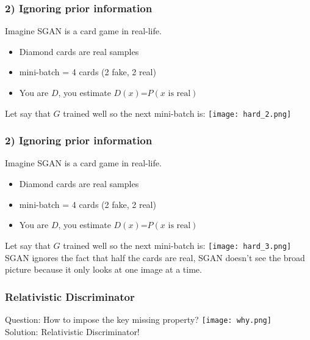 \documentclass[t]{beamer}
\begin{document}

\begin{frame}
	\frametitle{2) Ignoring prior information}
	
	Imagine SGAN is a card game in real-life. 
	\begin{itemize}
		\item Diamond cards are real samples
		\item mini-batch = 4 cards (2 fake, 2 real)
		\item You are $D$, you estimate $D(x)$=$P(x \text{ is real})$
	\end{itemize} \vspace{.10cm}
	Let say that $G$ trained well so the next mini-batch is:
	\centering
	\texttt{[image: hard\_2.png]}
\end{frame}


\begin{frame}
	\frametitle{2) Ignoring prior information}
	
	Imagine SGAN is a card game in real-life. 
	\begin{itemize}
		\item Diamond cards are real samples
		\item mini-batch = 4 cards (2 fake, 2 real)
		\item You are $D$, you estimate $D(x)$=$P(x \text{ is real})$
	\end{itemize} \vspace{.10cm}
	Let say that $G$ trained well so the next mini-batch is:
	\centering
	\texttt{[image: hard\_3.png]} \\
	SGAN ignores the fact that half the cards are real, SGAN doesn't see the broad picture because it only looks at one image at a time.
\end{frame}


\begin{frame}
	\frametitle{Relativistic Discriminator}
	Question: How to impose the key missing property? \texttt{[image: why.png]} \\
	Solution: Relativistic Discriminator! \vspace{.25cm}
	
\end{frame}


\end{document}

